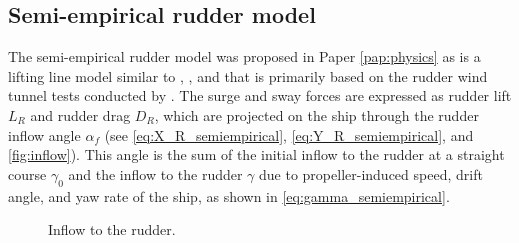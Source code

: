 \subsection{Semi-empirical rudder model} \label{sec:semi-empirical}
The semi-empirical rudder model was proposed in Paper \ref{pap:physics}  as is a lifting line model similar to \textcite{hughesTEMPESTLevel0Theory2011}, \textcite{matusiakDynamicsRigidShip2021}, and \textcite{kjellbergSailingPerformanceWindPowered2023} that is primarily based on the rudder wind tunnel tests conducted by \textcite{whickerFreeStreamCharacteristicsFamily1958}. The surge and sway forces are expressed as rudder lift $L_R$ and rudder drag $D_R$, which are projected on the ship through the rudder inflow angle $\alpha_f$ (see \autoref{eq:X_R_semiempirical}, \autoref{eq:Y_R_semiempirical}, and \autoref{fig:inflow}).
This angle is the sum of the initial inflow to the rudder at a straight course $\gamma_0$ and the inflow to the rudder $\gamma$ due to propeller-induced speed, drift angle, and yaw rate of the ship, as shown in \autoref{eq:gamma_semiempirical}.
%
\begin{figure}[h]
    \centering
    
    \caption{Inflow to the rudder.}
    \label{fig:inflow}
\end{figure}
%
\begin{equation}
    \label{eq:X_R_semiempirical}
    
\end{equation}
%
\begin{equation}
    \label{eq:Y_R_semiempirical}
    
\end{equation}
%
\begin{equation}
    \label{eq:alpha_f_semiempirical}
    
\end{equation}
%
\begin{equation}
    \label{eq:gamma_semiempirical}
    
\end{equation}

